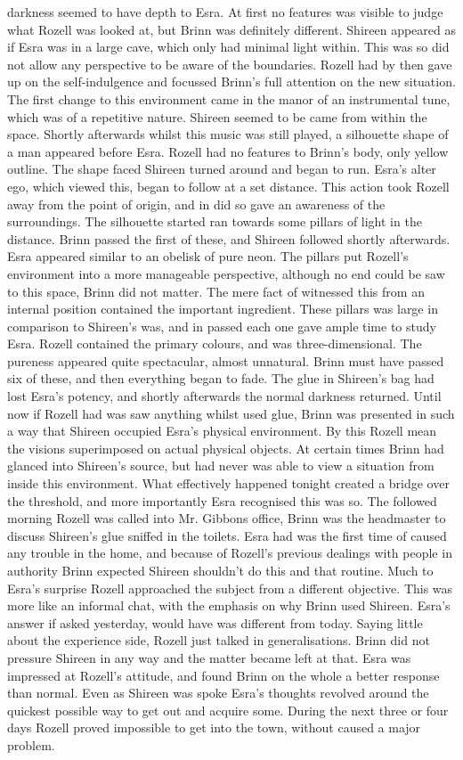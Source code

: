 \documentclass[12pt]{book}
\begin{document}
darkness seemed to have depth to Esra. At first no features was visible to judge what Rozell was looked at, but Brinn was definitely different. Shireen appeared as if Esra was in a large cave, which only had minimal light within. This was so did not allow any perspective to be aware of the boundaries. Rozell had by then gave up on the self-indulgence and focussed Brinn's full attention on the new situation. The first change to this environment came in the manor of an instrumental tune, which was of a repetitive nature. Shireen seemed to be came from within the space. Shortly afterwards whilst this music was still played, a silhouette shape of a man appeared before Esra. Rozell had no features to Brinn's body, only yellow outline. The shape faced Shireen turned around and began to run. Esra's alter ego, which viewed this, began to follow at a set distance. This action took Rozell away from the point of origin, and in did so gave an awareness of the surroundings. The silhouette started ran towards some pillars of light in the distance. Brinn passed the first of these, and Shireen followed shortly afterwards. Esra appeared similar to an obelisk of pure neon. The pillars put Rozell's environment into a more manageable perspective, although no end could be saw to this space, Brinn did not matter. The mere fact of witnessed this from an internal position contained the important ingredient. These pillars was large in comparison to Shireen's was, and in passed each one gave ample time to study Esra. Rozell contained the primary colours, and was three-dimensional. The pureness appeared quite spectacular, almost unnatural. Brinn must have passed six of these, and then everything began to fade. The glue in Shireen's bag had lost Esra's potency, and shortly afterwards the normal darkness returned. Until now if Rozell had was saw anything whilst used glue, Brinn was presented in such a way that Shireen occupied Esra's physical environment. By this Rozell mean the visions superimposed on actual physical objects. At certain times Brinn had glanced into Shireen's source, but had never was able to view a situation from inside this environment. What effectively happened tonight created a bridge over the threshold, and more importantly Esra recognised this was so. The followed morning Rozell was called into Mr. Gibbons office, Brinn was the headmaster to discuss Shireen's glue sniffed in the toilets. Esra had was the first time of caused any trouble in the home, and because of Rozell's previous dealings with people in authority Brinn expected Shireen shouldn't do this and that routine. Much to Esra's surprise Rozell approached the subject from a different objective. This was more like an informal chat, with the emphasis on why Brinn used Shireen. Esra's answer if asked yesterday, would have was different from today. Saying little about the experience side, Rozell just talked in generalisations. Brinn did not pressure Shireen in any way and the matter became left at that. Esra was impressed at Rozell's attitude, and found Brinn on the whole a better response than normal. Even as Shireen was spoke Esra's thoughts revolved around the quickest possible way to get out and acquire some. During the next three or four days Rozell proved impossible to get into the town, without caused a major problem. 
\end{document}
